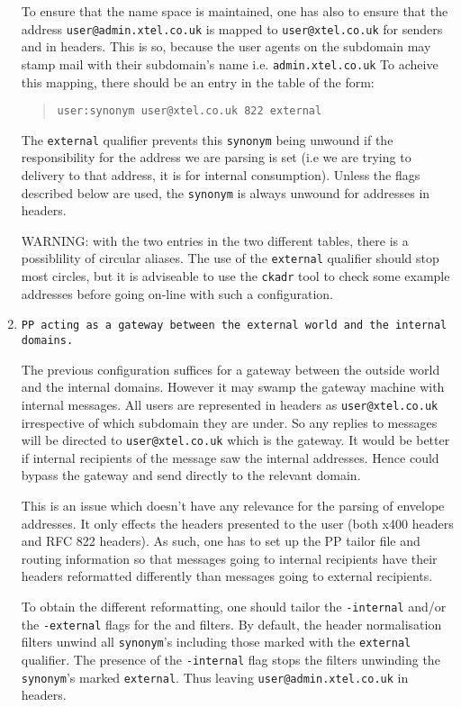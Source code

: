\begin{enumerate}
To ensure that the name space is maintained, one has also to ensure
that the address \verb+user@admin.xtel.co.uk+ is mapped to
\verb+user@xtel.co.uk+ for senders and in headers.
This is so, because the user agents on the subdomain may stamp mail
with their subdomain's name i.e. \verb+admin.xtel.co.uk+
To acheive this mapping, there should be an entry in the
 table of the form:
\begin{quote}\small\begin{verbatim}
user:synonym user@xtel.co.uk 822 external
\end{verbatim}\end{quote}
The \verb+external+ qualifier prevents this \verb+synonym+ being
unwound if the responsibility for the address we are parsing is set
(i.e we are trying to delivery to that address, it is for internal
consumption).  Unless the flags described below are used, the
\verb+synonym+ is always unwound for addresses in headers.

WARNING: with the two entries in the two different 
tables, there is a possiblility of circular aliases.
The use of the \verb+external+ qualifier should stop most circles, but
it is adviseable to use the \verb+ckadr+ tool to check some example
addresses before going on-line with such a configuration.

\item {\tt PP acting as a gateway between the external world and the
internal domains.}

The previous configuration suffices for a gateway between the outside
world and the internal domains.  However it may swamp the gateway
machine with internal messages.  All users are represented in headers
as \verb+user@xtel.co.uk+ irrespective of which subdomain they are
under.  So any replies to messages will be directed to
\verb+user@xtel.co.uk+ which is the gateway.  It would be better if
internal recipients of the message saw the internal addresses.  Hence
could bypass the gateway and send directly to the relevant domain.

This is an issue which doesn't have any relevance for the parsing of
envelope addresses.  It only effects the headers presented to the user
(both x400 headers and RFC 822 headers).  As such, one has to set up
the PP tailor file and routing information so that messages going to
internal recipients have their headers reformatted differently than
messages going to external recipients.

To obtain the different reformatting, one should tailor the
\verb+-internal+ and/or the \verb+-external+ flags for the
 and  filters.
By default, the header normalisation filters unwind all
\verb+synonym+'s including those marked with the \verb+external+
qualifier.  The presence of the \verb+-internal+ flag stops the
filters unwinding the \verb+synonym+'s marked \verb+external+.  Thus
leaving \verb+user@admin.xtel.co.uk+ in headers.

\end{enumerate}


